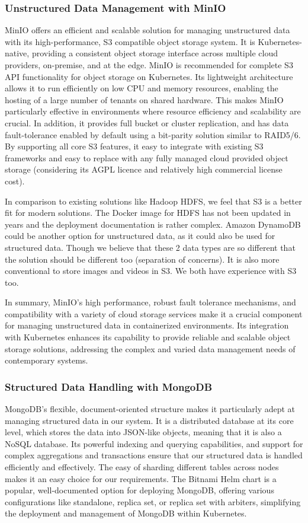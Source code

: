\documentclass{report}
\begin{document}
    \subsubsection{Unstructured Data Management with MinIO}
    MinIO offers an efficient and scalable solution for managing unstructured data with its high-performance, S3 compatible object storage system. It is Kubernetes-native, providing a consistent object storage interface across multiple cloud providers, on-premise, and at the edge. MinIO is recommended for complete S3 API functionality for object storage on Kubernetes. Its lightweight architecture allows it to run efficiently on low CPU and memory resources, enabling the hosting of a large number of tenants on shared hardware. This makes MinIO particularly effective in environments where resource efficiency and scalability are crucial. In addition, it provides full bucket or cluster replication, and has data fault-tolerance enabled by default using a bit-parity solution similar to RAID5/6. By supporting all core S3 features, it easy to integrate with existing S3 frameworks and easy to replace with any fully managed cloud provided object storage (considering its AGPL licence and relatively high commercial license cost).

    In comparison to existing solutions like Hadoop HDFS, we feel that S3 is a better fit for modern solutions. The Docker image for HDFS has not been updated in years and the deployment documentation is rather complex. Amazon DynamoDB could be another option for unstructured data, as it could also be used for structured data. Though we believe that these 2 data types are so different that the solution should be different too (separation of concerns). It is also more conventional to store images and videos in S3. We both have experience with S3 too.

    In summary, MinIO's high performance, robust fault tolerance mechanisms, and compatibility with a variety of cloud storage services make it a crucial component for managing unstructured data in containerized environments. Its integration with Kubernetes enhances its capability to provide reliable and scalable object storage solutions, addressing the complex and varied data management needs of contemporary systems.

    \subsubsection{Structured Data Handling with MongoDB}
    MongoDB's flexible, document-oriented structure makes it particularly adept at managing structured data in our system. It is a distributed database at its core level, which stores the data into JSON-like objects, meaning that it is also a NoSQL database. Its powerful indexing and querying capabilities, and support for complex aggregations and transactions ensure that our structured data is handled efficiently and effectively. The easy of sharding different tables across nodes makes it an easy choice for our requirements. The Bitnami Helm chart is a popular, well-documented option for deploying MongoDB, offering various configurations like standalone, replica set, or replica set with arbiters, simplifying the deployment and management of MongoDB within Kubernetes.
\end{document}
